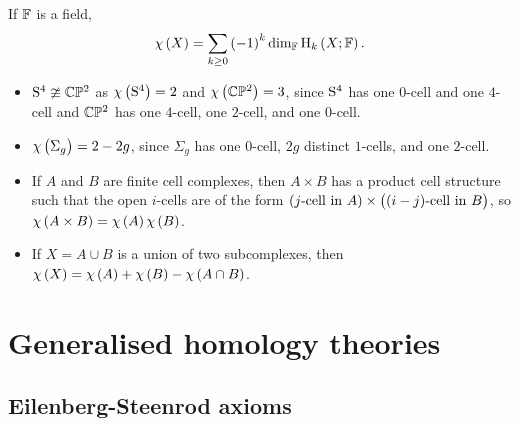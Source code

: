 \begin{remark*}
If $ \FF $ is a field,
$$ \chi\br{X} = \sum_{k \ge 0} \br{-1}^k\dim_\FF \H_k\br{X; \FF}. $$
\end{remark*}

\begin{example*}
\hfill
\begin{itemize}
\item $ \S^4 \ncong \CC\PP^2 $ as $ \chi\br{\S^4} = 2 $ and $ \chi\br{\CC\PP^2} = 3 $, since $ \S^4 $ has one $ 0 $-cell and one $ 4 $-cell and $ \CC\PP^2 $ has one $ 4 $-cell, one $ 2 $-cell, and one $ 0 $-cell.
\item $ \chi\br{\Sigma_g} = 2 - 2g $, since $ \Sigma_g $ has one $ 0 $-cell, $ 2g $ distinct $ 1 $-cells, and one $ 2 $-cell.
\item If $ A $ and $ B $ are finite cell complexes, then $ A \times B $ has a product cell structure such that the open $ i $-cells are of the form $ \br{\text{$ j $-cell in} \ A} \times \br{\text{$ \br{i - j} $-cell in} \ B} $, so $ \chi\br{A \times B} = \chi\br{A}\chi\br{B} $.
\item If $ X = A \cup B $ is a union of two subcomplexes, then $ \chi\br{X} = \chi\br{A} + \chi\br{B} - \chi\br{A \cap B} $.
\end{itemize}
\end{example*}

\pagebreak

\section{Generalised homology theories}

\subsection{Eilenberg-Steenrod axioms}


